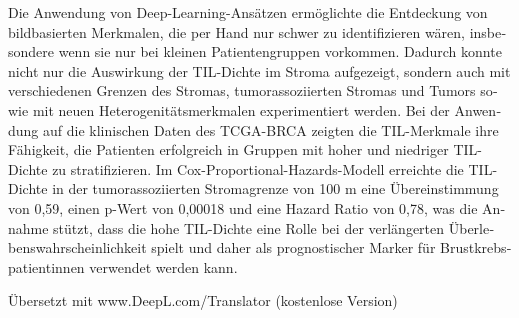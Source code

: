 \begin{otherlanguage}{ngerman}
Die Anwendung von Deep-Learning-Ansätzen ermöglichte die Entdeckung von bildbasierten Merkmalen, die per Hand nur schwer zu identifizieren wären, insbesondere wenn sie nur bei kleinen Patientengruppen vorkommen. Dadurch konnte nicht nur die Auswirkung der TIL-Dichte im Stroma aufgezeigt, sondern auch mit verschiedenen Grenzen des Stromas, tumorassoziierten Stromas und Tumors sowie mit neuen Heterogenitätsmerkmalen experimentiert werden.
Bei der Anwendung auf die klinischen Daten des TCGA-BRCA zeigten die TIL-Merkmale ihre Fähigkeit, die Patienten erfolgreich in Gruppen mit hoher und niedriger TIL-Dichte zu stratifizieren. Im Cox-Proportional-Hazards-Modell erreichte die TIL-Dichte in der tumorassoziierten Stromagrenze von 100 \textmu m eine Übereinstimmung von 0,59, einen p-Wert von 0,00018 und eine Hazard Ratio von 0,78, was die Annahme stützt, dass die hohe TIL-Dichte eine Rolle bei der verlängerten Überlebenswahrscheinlichkeit spielt und daher als prognostischer Marker für Brustkrebspatientinnen verwendet werden kann.

Übersetzt mit www.DeepL.com/Translator (kostenlose Version)
\end{otherlanguage}


\makeatletter
{}
{\renewcommand{\abstractname}{Abstract}}
{\renewcommand{\abstractname}{Kurzfassung}}
\makeatother